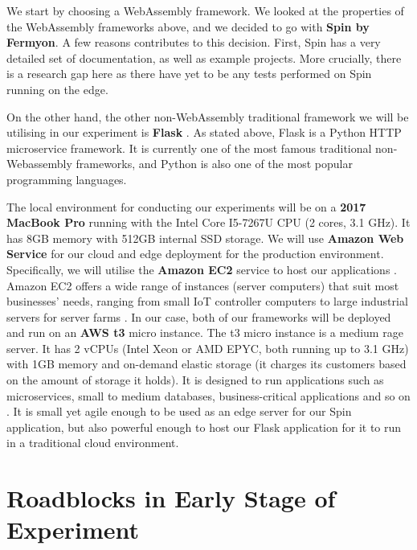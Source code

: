 We start by choosing a WebAssembly framework. We looked at the properties of the WebAssembly frameworks above, and we decided to go with \textbf{Spin by Fermyon}. A few reasons contributes to this decision. First, Spin has a very detailed set of documentation, as well as example projects. More crucially, there is a research gap here as there have yet to be any tests performed on Spin running on the edge.

On the other hand, the other non-WebAssembly traditional framework we will be utilising in our experiment is \textbf{Flask} \cite{exp19}. As stated above, Flask is a Python HTTP microservice framework. It is currently one of the most famous traditional non-Webassembly frameworks, and Python is also one of the most popular programming languages.

The local environment for conducting our experiments will be on a \textbf{2017 MacBook Pro} running with the Intel Core I5-7267U CPU (2 cores, 3.1 GHz). It has 8GB memory with 512GB internal SSD storage. We will use \textbf{Amazon Web Service} for our cloud and edge deployment for the production environment. Specifically, we will utilise the \textbf{Amazon EC2} service to host our applications \cite{exp36}. Amazon EC2 offers a wide range of instances (server computers) that suit most businesses' needs, ranging from small IoT controller computers to large industrial servers for server farms \cite{exp37}. In our case, both of our frameworks will be deployed and run on an \textbf{AWS t3} micro instance. The t3 micro instance is a medium rage server. It has 2 vCPUs (Intel Xeon or AMD EPYC, both running up to 3.1 GHz) with 1GB memory and on-demand elastic storage (it charges its customers based on the amount of storage it holds). It is designed to run applications such as microservices, small to medium databases, business-critical applications and so on \cite{exp38}. It is small yet agile enough to be used as an edge server for our Spin application, but also powerful enough to host our Flask application for it to run in a traditional cloud environment.

\bigskip
\section{Roadblocks in Early Stage of Experiment}

